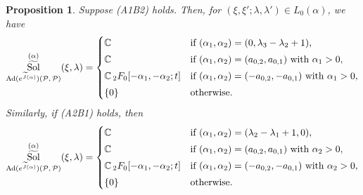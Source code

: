 \documentclass[a4paper,11pt,reqno]{amsart}
\newcommand{\calP}{\mathcal{P}}
\newcommand{\0}{{\bf 0}}
\newcommand{\C}{\mathbb{C}}
\newcommand{\1}{{\bf 1}}
\DeclareMathOperator{\Ad}{Ad}
\DeclareMathOperator{\Sol}{Sol}
\newcommand{\wJ}{\widetilde{J}}
\DeclareMathOperator{\wSol}{\widetilde{\Sol}}
\theoremstyle{plain}
\newtheorem{proposition}[equation]{Proposition}
\theoremstyle{definition}
\numberwithin{equation}{section}
\theoremstyle{definition}
\begin{document}
\begin{proposition}\label{prop:A1B2_A2B1}
Suppose \textnormal{(A1B2)} holds.
Then, for $(\xi,\xi';\lambda,\lambda')\in L_0(\alpha)$,
we have 
\begin{equation*}
\wSol_{\Ad(e^{\wJ(\alpha)})(\calP,\, \calP)}^{(\alpha)}(\xi,\lambda)
=
\begin{cases}
\C&\textnormal{if $(\alpha_1,\alpha_2)=(0, \lambda_3-\lambda_2+1)$},\\[3pt]
\C&\textnormal{if $(\alpha_1,\alpha_2)=(a_{0,2},a_{0,1})$ with $\alpha_1 >0$},\\[3pt]
\C\,{}_2F_0[-\alpha_1,-\alpha_2;t]
&\textnormal{if $(\alpha_1,\alpha_2)=(-a_{0,2},-a_{0,1})$ with $\alpha_1 >0$},\\[3pt]
\{0\} & \textnormal{otherwise}.
\end{cases}
\end{equation*}
Similarly, if \textnormal{(A2B1)} holds, then  
\begin{equation*}
\wSol_{\Ad(e^{\wJ(\alpha)})(\calP,\, \calP)}^{(\alpha)}(\xi,\lambda)
=
\begin{cases}
\C&\textnormal{if $(\alpha_1,\alpha_2)=(\lambda_2-\lambda_1+1, 0)$},\\[3pt]
\C&\textnormal{if $(\alpha_1,\alpha_2)=(a_{0,2},a_{0,1})$ with $\alpha_2 >0$},\\[3pt]
\C\,{}_2F_0[-\alpha_1,-\alpha_2;t]
&\textnormal{if $(\alpha_1,\alpha_2)=(-a_{0,2},-a_{0,1})$ with $\alpha_2 >0$},\\[3pt]
\{0\} & \textnormal{otherwise}.
\end{cases}
\end{equation*}
\end{proposition}
\end{document}
